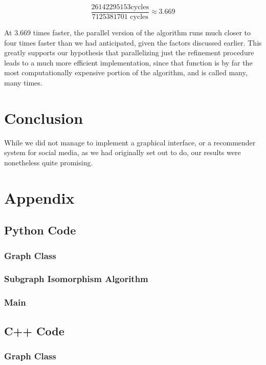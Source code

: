 \documentclass{article}
\begin{document}
  \[ \frac{26142295153 \mathrm{ cycles}}{7125381701 \textrm{ cycles}} \approx 3.669 \]

  At 3.669 times faster, the parallel version of the algorithm runs much closer to four times faster than we had anticipated, given the factors discussed earlier. This greatly supports our hypothesis that parallelizing just the refinement procedure leads to a much more efficient implementation, since that function is by far the most computationally expensive portion of the algorithm, and is called many, many times.

\section{Conclusion}
  While we did not manage to implement a graphical interface, or a recommender system for social media, as we had originally set out to do, our results were nonetheless quite promising.

\section{Appendix}
  \subsection{Python Code}
    \subsubsection{Graph Class}
      
    \subsubsection{Subgraph Isomorphism Algorithm}
      
    \subsubsection{Main}
      

  \subsection{C++ Code}
    \subsubsection{Graph Class}
      
\end{document}
